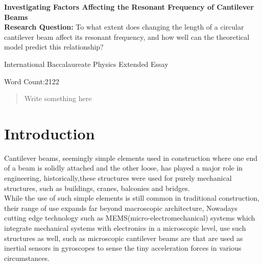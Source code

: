 \documentclass[a4paper,12pt]{article}
\newcommand{\ResearchQ}{To what extent does changing the length of a circular cantilever beam affect its resonant frequency, and how well can the theoretical model predict this relationship?}
\begin{document}
\begin{titlepage}
    \begin{center}
        \vspace*{1cm}

        \textbf{Investigating Factors Affecting the Resonant Frequency of Cantilever Beams}\\

        \vspace{.5cm}
        \textbf{Research Question:}
        \ResearchQ

        \vspace{0.5cm}
        International Baccalaureate Physics Extended Essay

        \vfill

        \vspace{0.8cm}

        Word Count:2122


    \end{center}
\end{titlepage}
\tableofcontents
{}
\pagebreak

\begin{abstract}

    Write something here
\end{abstract}
\pagebreak


\section{Introduction}\label{Intro}%

Cantilever beams, seemingly simple elements used in construction where one end of a beam is solidly attached and the other loose, has played a major role in engineering, historically,these structures were used for purely mechanical structures, such as buildings, cranes, balconies and bridges.\autocite{BuildingConstructionBook}\\
While the use of such simple elements is still common in traditional construction, their range of use expands far beyond macroscopic architecture, Nowadays cutting edge technology such as MEMS(micro-electromechanical) systems which integrate mechanical systems with electronics in a microscopic level, use such structures as well, such as microscopic cantilever beams are that are used as inertial sensors in gyroscopes to sense the tiny acceleration forces in various circumstances.\autocite{MemsBook}%
\end{document}
